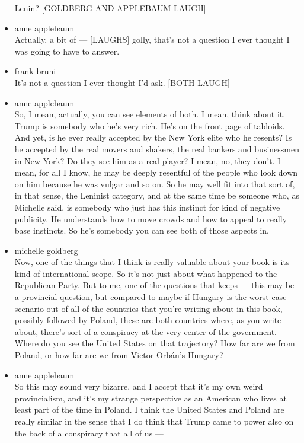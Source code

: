 \begin{itemize}
  Lenin? {[}GOLDBERG AND APPLEBAUM LAUGH{]}
\item
  anne applebaum\\
  Actually, a bit of --- {[}LAUGHS{]} golly, that's not a question I
  ever thought I was going to have to answer.
\item
  frank bruni\\
  It's not a question I ever thought I'd ask. {[}BOTH LAUGH{]}
\item
  anne applebaum\\
  So, I mean, actually, you can see elements of both. I mean, think
  about it. Trump is somebody who he's very rich. He's on the front page
  of tabloids. And yet, is he ever really accepted by the New York elite
  who he resents? Is he accepted by the real movers and shakers, the
  real bankers and businessmen in New York? Do they see him as a real
  player? I mean, no, they don't. I mean, for all I know, he may be
  deeply resentful of the people who look down on him because he was
  vulgar and so on. So he may well fit into that sort of, in that sense,
  the Leninist category, and at the same time be someone who, as
  Michelle said, is somebody who just has this instinct for kind of
  negative publicity. He understands how to move crowds and how to
  appeal to really base instincts. So he's somebody you can see both of
  those aspects in.
\item
  michelle goldberg\\
  Now, one of the things that I think is really valuable about your book
  is its kind of international scope. So it's not just about what
  happened to the Republican Party. But to me, one of the questions that
  keeps --- this may be a provincial question, but compared to maybe if
  Hungary is the worst case scenario out of all of the countries that
  you're writing about in this book, possibly followed by Poland, these
  are both countries where, as you write about, there's sort of a
  conspiracy at the very center of the government. Where do you see the
  United States on that trajectory? How far are we from Poland, or how
  far are we from Victor Orbán's Hungary?
\item
  anne applebaum\\
  So this may sound very bizarre, and I accept that it's my own weird
  provincialism, and it's my strange perspective as an American who
  lives at least part of the time in Poland. I think the United States
  and Poland are really similar in the sense that I do think that Trump
  came to power also on the back of a conspiracy that all of us ---

\end{itemize}
